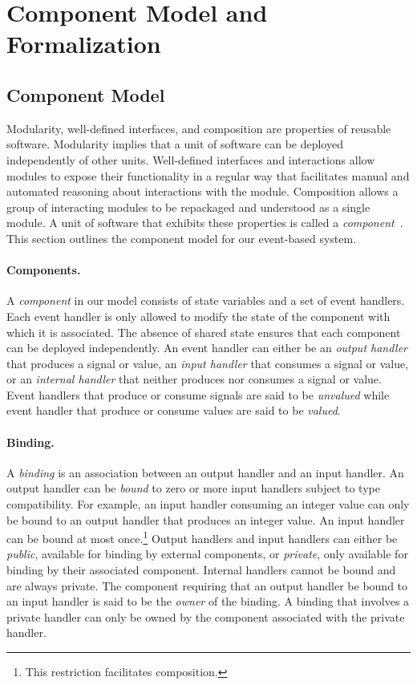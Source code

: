 \section{Component Model and Formalization\label{system_model}}

\subsection{Component Model}

Modularity, well-defined interfaces, and composition are properties of reusable software.
Modularity implies that a unit of software can be deployed independently of other units.
Well-defined interfaces and interactions allow modules to expose their functionality in a regular way that facilitates manual and automated reasoning about interactions with the module.
Composition allows a group of interacting modules to be repackaged and understood as a single module.
A unit of software that exhibits these properties is called a \emph{component}~\cite{szyperski2002component}.
This section outlines the component model for our event-based system.

\paragraph{Components.}
A \emph{component} in our model consists of state variables and a set of event handlers.
Each event handler is only allowed to modify the state of the component with which it is associated.
The absence of shared state ensures that each component can be deployed independently.
An event handler can either be an \emph{output handler} that produces a signal or value, an \emph{input handler} that consumes a signal or value, or an \emph{internal handler} that neither produces nor consumes a signal or value.
Event handlers that produce or consume signals are said to be \emph{unvalued} while event handler that produce or consume values are said to be \emph{valued}.

\paragraph{Binding.}
A \emph{binding} is an association between an output handler and an input handler.
An output handler can be \emph{bound} to zero or more input handlers subject to type compatibility.
For example, an input handler consuming an integer value can only be bound to an output handler that produces an integer value.
An input handler can be bound at most once.\footnote{This restriction facilitates composition.}
Output handlers and input handlers can either be \emph{public}, available for binding by external components, or \emph{private}, only available for binding by their associated component.
Internal handlers cannot be bound and are always private.
The component requiring that an output handler be bound to an input handler is said to be the \emph{owner} of the binding.
A binding that involves a private handler can only be owned by the component associated with the private handler.

